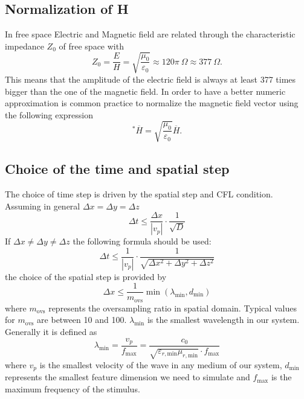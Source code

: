 \subsection{Normalization of H}
In free space Electric and Magnetic field are related through the characteristic impedance $Z_0$ of free space with
\begin{equation*}
	Z_0 = \frac{E}{H}=\sqrt{\frac{\mu_0}{\varepsilon_0}} \approx 120\pi~\Omega \approx 377~\Omega.
\end{equation*}
This means that the amplitude of the electric field is always at least 377 times bigger than the one of the magnetic field. In order to have a better numeric approximation is common practice to normalize the magnetic field vector using the following expression
\begin{equation*}
	^*\overline{H} = \sqrt{\frac{\mu_0}{\varepsilon_0}} \overline{H}.
\end{equation*}

\subsection{Choice of the time and spatial step}
\label{sec:steps}
The choice of time step is driven by the spatial step and CFL condition. Assuming in general  $\Delta x = \Delta y = \Delta z$ 
\begin{equation*}
	\Delta t \leq \frac{\Delta x}{|v_p|} \cdot \frac{1}{\sqrt{D}}
\end{equation*}
If $\Delta x \neq \Delta y \neq \Delta z$ the following formula should be used:
\begin{equation*}
	\Delta t \leq \frac{1}{|v_p|} \cdot \frac{1}{\sqrt{\Delta x^2+\Delta y^2+\Delta z^2}}
\end{equation*}
the choice of the spatial step is provided by 
\begin{equation*}
	\Delta x \leq \frac{1}{m_\textrm{ovs}} \min (\lambda_\textrm{min},d_\textrm{min})
\end{equation*}
where $m_\textrm{ovs}$ represents the oversampling ratio in spatial domain. Typical values for $m_\textrm{ovs}$ are between 10 and 100. $\lambda_\textrm{min}$ is the smallest wavelength in our system. Generally it is defined as 
\begin{equation*}
	\lambda_\textrm{min} = \frac{v_p}{f_\textrm{max}} = \frac{c_0}{\sqrt{\varepsilon_{r,\textrm{min}}\mu_{r,\textrm{min}}}\cdot f_\textrm{max} }
\end{equation*}
where $v_p$ is the smallest velocity of the wave in any medium of our system, $d_\textrm{min}$ represents the smallest feature dimension we need to simulate and $f_\textrm{max}$ is the maximum frequency of the stimulus.

